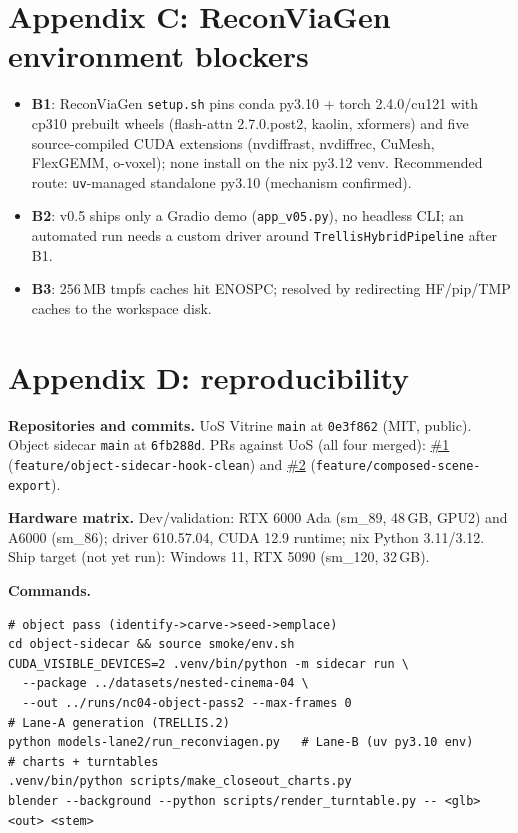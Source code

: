\section*{Appendix C: ReconViaGen environment blockers}
\begin{itemize}
\item \textbf{B1}: ReconViaGen \texttt{setup.sh} pins conda py3.10 + torch 2.4.0/cu121 with
cp310 prebuilt wheels (flash-attn 2.7.0.post2, kaolin, xformers) and five source-compiled CUDA
extensions (nvdiffrast, nvdiffrec, CuMesh, FlexGEMM, o-voxel); none install on the nix py3.12 venv.
Recommended route: \texttt{uv}-managed standalone py3.10 (mechanism confirmed).
\item \textbf{B2}: v0.5 ships only a Gradio demo (\texttt{app\_v05.py}), no headless CLI; an
automated run needs a custom driver around \texttt{TrellisHybridPipeline} after B1.
\item \textbf{B3}: 256\,MB tmpfs caches hit ENOSPC; resolved by redirecting HF/pip/TMP caches to
the workspace disk.
\end{itemize}


\section*{Appendix D: reproducibility}
\small

\textbf{Repositories and commits.} UoS Vitrine \texttt{main} at \texttt{0e3f862} (MIT, public).
Object sidecar \texttt{main} at \texttt{6fb288d}. PRs against UoS (all four merged):
\href{https://github.com/ArtechShadow/UOS-Vitrine/pull/1}{\#1}
(\texttt{feature/object-sidecar-hook-clean}) and
\href{https://github.com/ArtechShadow/UOS-Vitrine/pull/2}{\#2}
(\texttt{feature/composed-scene-export}).

\textbf{Hardware matrix.} Dev/validation: RTX 6000 Ada (sm\_89, 48\,GB, GPU2) and A6000 (sm\_86);
driver 610.57.04, CUDA 12.9 runtime; nix Python 3.11/3.12. Ship target (not yet run): Windows 11,
RTX 5090 (sm\_120, 32\,GB).

\textbf{Commands.}
\begin{verbatim}
# object pass (identify->carve->seed->emplace)
cd object-sidecar && source smoke/env.sh
CUDA_VISIBLE_DEVICES=2 .venv/bin/python -m sidecar run \
  --package ../datasets/nested-cinema-04 \
  --out ../runs/nc04-object-pass2 --max-frames 0
# Lane-A generation (TRELLIS.2)
python models-lane2/run_reconviagen.py   # Lane-B (uv py3.10 env)
# charts + turntables
.venv/bin/python scripts/make_closeout_charts.py
blender --background --python scripts/render_turntable.py -- <glb> <out> <stem>
\end{verbatim}

